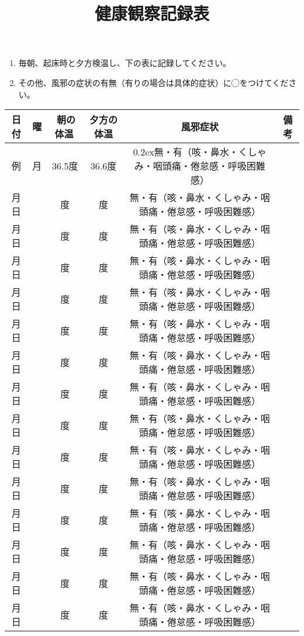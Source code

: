 \documentclass{jsarticle}
\title{健康観察記録表}
\author{\fbox{学籍番号 20XXXXXXX 所属 〇〇学群〇〇学類 氏名 筑波太郎}\and \fbox{平熱 . 度}}
\date{}
\newcommand{\ctext}[1]{\raise0.2ex\hbox{\textcircled{\scriptsize{#1}}}}
\begin{document}
\maketitle
\begin{enumerate}
\item{毎朝、起床時と夕方検温し、下の表に記録してください。}
\item{その他、風邪の症状の有無（有りの場合は具体的症状）に◯をつけてください。}
\end{enumerate}

\begin{table}[htb]
\begin{tabular}{|c|c|c|c|c|c|}\hline
日付&曜&$\ $朝の体温$\ $&夕方の体温&風邪症状&備考\\ \hline
\rowcolor[gray]{0.8}
例&月&36.5度&36.6度&\ctext{無}・有（咳・鼻水・くしゃみ・咽頭痛・倦怠感・呼吸困難感）&\\ \hline
月日&&度&度&無・有（咳・鼻水・くしゃみ・咽頭痛・倦怠感・呼吸困難感）&\\ \hline
月日&&度&度&無・有（咳・鼻水・くしゃみ・咽頭痛・倦怠感・呼吸困難感）&\\ \hline
月日&&度&度&無・有（咳・鼻水・くしゃみ・咽頭痛・倦怠感・呼吸困難感）&\\ \hline
月日&&度&度&無・有（咳・鼻水・くしゃみ・咽頭痛・倦怠感・呼吸困難感）&\\ \hline
月日&&度&度&無・有（咳・鼻水・くしゃみ・咽頭痛・倦怠感・呼吸困難感）&\\ \hline
月日&&度&度&無・有（咳・鼻水・くしゃみ・咽頭痛・倦怠感・呼吸困難感）&\\ \hline
月日&&度&度&無・有（咳・鼻水・くしゃみ・咽頭痛・倦怠感・呼吸困難感）&\\ \hline
月日&&度&度&無・有（咳・鼻水・くしゃみ・咽頭痛・倦怠感・呼吸困難感）&\\ \hline
月日&&度&度&無・有（咳・鼻水・くしゃみ・咽頭痛・倦怠感・呼吸困難感）&\\ \hline
月日&&度&度&無・有（咳・鼻水・くしゃみ・咽頭痛・倦怠感・呼吸困難感）&\\ \hline
月日&&度&度&無・有（咳・鼻水・くしゃみ・咽頭痛・倦怠感・呼吸困難感）&\\ \hline
月日&&度&度&無・有（咳・鼻水・くしゃみ・咽頭痛・倦怠感・呼吸困難感）&\\ \hline
月日&&度&度&無・有（咳・鼻水・くしゃみ・咽頭痛・倦怠感・呼吸困難感）&\\ \hline
月日&&度&度&無・有（咳・鼻水・くしゃみ・咽頭痛・倦怠感・呼吸困難感）&\\ \hline
\end{tabular}
\end{table}
\end{document}

